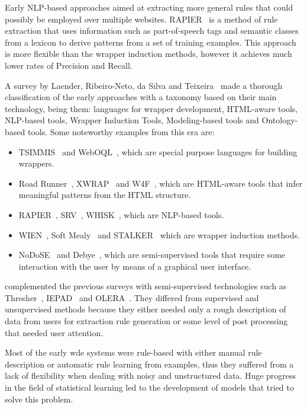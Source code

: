 \documentclass{nle}
\begin{document}
Early NLP-based approaches aimed at extracting more general rules that could possibly
be employed over multiple websites. RAPIER~\cite{Califf1999} is a method of rule
extraction that uses information such as part-of-speech tags and semantic classes from
a lexicon to derive patterns from a set of training examples. This approach is more
flexible than the wrapper induction methods, however it achieves much lower rates of 
Precision and Recall.

A survey by Laender, Ribeiro-Neto, da Silva and Teixeira~ made a thorough classification of the
early approaches with a taxonomy based on their main technology, being them: languages for
wrapper development, HTML-aware tools, NLP-based tools, Wrapper Induction Tools,
Modeling-based tools and Ontology-based tools. Some noteworthy examples from this era
are: 
%
\begin{itemize}
\item TSIMMIS~\cite{Hammer1997} and WebOQL~\cite{Arocena1999}, which are special purpose 
languages for building wrappers.
\item Road Runner~\cite{Crescenzi2001}, XWRAP~\cite{Liu2000} and W4F~\cite{Sahuguet1999}, 
which are HTML-aware tools that infer meaningful patterns from the HTML structure.
\item RAPIER~\cite{Califf1999}, SRV~\cite{Freitag1998}, WHISK~\cite{Soderland1999}, which 
are NLP-based tools.
\item WIEN~\cite{Kushmerick2000}, Soft Mealy~\cite{Hsu1998} and STALKER~\cite{Muslea1999} which 
are wrapper induction methods.
\item NoDoSE~\cite{Adelberg1998} and Debye~\cite{Laender2002a}, which are semi-supervised
tools that require some interaction with the user by means of a graphical
user interface.
\end{itemize}
%
\cite{Chang2006} complemented the previous surveys with semi-supervised 
technologies such as Thresher~\cite{Hogue2005}, IEPAD~\cite{Chang2001} and 
OLERA~\cite{Chang2004}. They differed from supervised 
and unsupervised methods because they either needed only a rough description of
data from users for extraction rule generation or some level of post processing
that needed user attention. 

Most of the early \gls{wde} systems were rule-based with either 
manual rule description or automatic rule learning from examples, thus they
suffered from a lack of flexibility when dealing with noisy and unstructured data.
Huge progress in the field of statistical learning led to the development of
models that tried to solve this problem.
\end{document}
